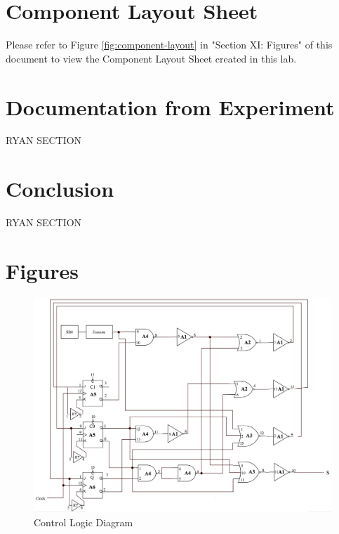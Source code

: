\documentclass[journal, twocolumn, final,11pt,letterpaper]{IEEEtran}
\begin{document}
\section{Component Layout Sheet}
Please refer to Figure \ref{fig:component-layout} in "Section XI: Figures" of this document to view the Component Layout Sheet created in this lab.

\section{Documentation from Experiment}
RYAN SECTION


\section{Conclusion}
RYAN SECTION

\clearpage
\onecolumn
\section{Figures}

\begin{figure} [H]
	\centering
	\includegraphics[scale=0.55]{Control_Logic.png}
	\caption{Control Logic Diagram\label{fig:control-logic-diagram}}
\end{figure}
\end{document}
